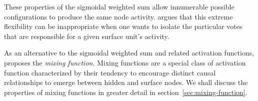 These properties of the sigmoidal weighted sum allow innumerable possible configurations to produce the same node activity.  \citet{saund:94} argues that this extreme flexibility can be inappropriate when one wants to isolate the particular votes that are responsible for a given surface unit's activity. 
%
%
%

As an alternative to the sigmoidal weighted sum and related activation functions, \cite{saund:94} proposes the \emph{mixing function}. Mixing functions are a special class of activation function characterized by their tendency to encourage distinct causal relationships to emerge between hidden and surface nodes.   %
We shall discuss the properties of mixing functions in greater detail in section~\ref{sec:mixing-function}.


